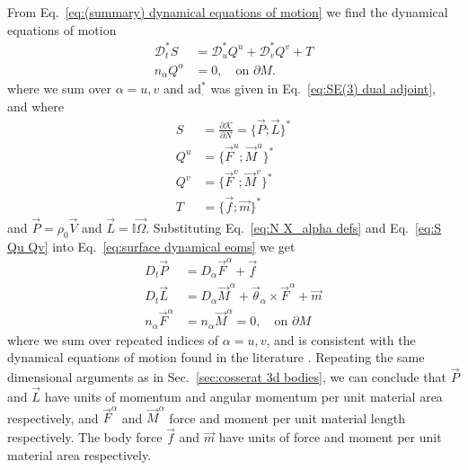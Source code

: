 From Eq.~\ref{eq:(summary) dynamical equations of motion} we find the dynamical equations of motion
\begin{subequations}  \label{eq:surface dynamical eoms}
\begin{align}
\mathcal{D}_t^* S & = \mathcal{D}_u^* Q^u + \mathcal{D}_v^* Q^v + T \\
n_\alpha Q^\alpha & = 0, \quad \text{on } \partial M.
\end{align}
\end{subequations}
where we sum over $\alpha = u,v$ and $\text{ad}_{\cdot}^*$ was given in Eq.~\ref{eq:SE(3) dual adjoint}, and where
\begin{subequations} \label{eq:S Qu Qv}
\begin{align}
S & = \frac{\partial \mathcal{K}}{\partial N} = \{ \vec{P} ; \vec{L} \}^* \\
Q^u & = \{ \vec{F}^u ; \vec{M}^u \}^* \\
Q^v & = \{ \vec{F}^v ; \vec{M}^v \}^* \\
T & = \{ \vec{f} ; \vec{m} \}^*
\end{align}
\end{subequations}
and $\vec{P} = \rho_0 \vec{V}$ and $\vec{L} = \mathbb{I} \vec{\Omega}$.  Substituting Eq.~\ref{eq:N X_alpha defs} and Eq.~\ref{eq:S Qu Qv} into Eq.~\ref{eq:surface dynamical eoms} we get
\begin{subequations} \label{eq:cosserat surface dynamic eoms}
\begin{align}
D_t \vec{P} & = D_\alpha \vec{F}^\alpha + \vec{f} \label{eq:surface P eom} \\
D_t \vec{L} & = D_\alpha \vec{M}^\alpha + \vec{\theta}_\alpha \times \vec{F}^\alpha + \vec{m} \label{eq:surface L eom} \\
n_\alpha \vec{F}^\alpha & = n_\alpha \vec{M}^\alpha = 0, \quad \text{on } \partial M 
\end{align}
\end{subequations}
where we sum over repeated indices of $\alpha = u, v$, and is consistent with the dynamical equations of motion found in the literature \citep{altenbachCosseratMedia2013}. Repeating the same dimensional arguments as in Sec.~\ref{sec:cosserat 3d bodies}, we can conclude that $\vec{P}$ and $\vec{L}$ have units of momentum and angular momentum per unit material area respectively, and $\vec{F}^\alpha$ and $\vec{M}^\alpha$ force and moment per unit material length respectively. The body force $\vec{f}$ and $\vec{m}$ have units of force and moment per unit material area respectively.

